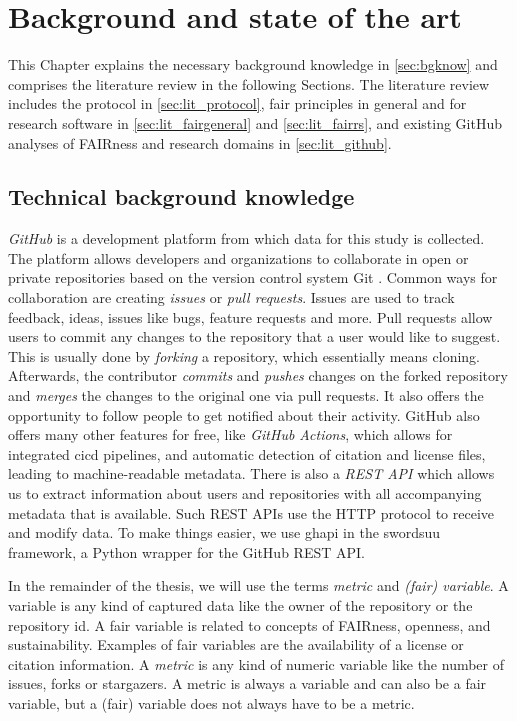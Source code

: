 
\chapter{Background and state of the art}
\label{chap:literature}
This Chapter explains the necessary background knowledge in \autoref{sec:bgknow} and comprises the literature review in the following Sections. The literature review includes the protocol in \autoref{sec:lit_protocol}, \acrshort{fair} principles in general and for research software in \autoref{sec:lit_fairgeneral} and \autoref{sec:lit_fairrs}, and existing GitHub analyses of FAIRness and research domains in \autoref{sec:lit_github}.

\section{Technical background knowledge}
\label{sec:bgknow}
\textit{GitHub} is a development platform from which data for this study is collected. The platform allows developers and organizations to collaborate in open or private repositories based on the version control system Git \cite{chacon2014pro}. Common ways for collaboration are creating \textit{issues} or \textit{pull requests}. Issues are used to track feedback, ideas, issues like bugs, feature requests and more. Pull requests allow users to commit any changes to the repository that a user would like to suggest. 
This is usually done by \textit{forking} a repository, which essentially means cloning. Afterwards, the contributor \textit{commits} and \textit{pushes} changes on the forked repository and \textit{merges} the changes to the original one via pull requests. It also offers the opportunity to follow people to get notified about their activity.
GitHub also offers many other features for free, like \textit{GitHub Actions}, which allows for integrated \acrfull{cicd} pipelines, and automatic detection of citation and license files, leading to machine-readable metadata. There is also a \textit{REST API} \cite{github_rest} which allows us to extract information about users and repositories with all accompanying metadata that is available. Such REST APIs use the HTTP protocol to receive and modify data. To make things easier, we use ghapi \cite{noauthor_ghapi_nodate} in the \acrshort{swordsuu} framework, a Python wrapper for the GitHub REST API.


In the remainder of the thesis, we will use the terms \textit{metric} and \textit{(\acrshort{fair}) variable}. A variable is any kind of captured data like the owner of the repository or the repository id. A \acrshort{fair} variable is related to concepts of FAIRness, openness, and sustainability. Examples of \acrshort{fair} variables are the availability of a license or citation information. A \textit{metric} is any kind of numeric variable like the number of issues, forks or stargazers. A metric is always a variable and can also be a \acrshort{fair} variable, but a (\acrshort{fair}) variable does not always have to be a metric.

